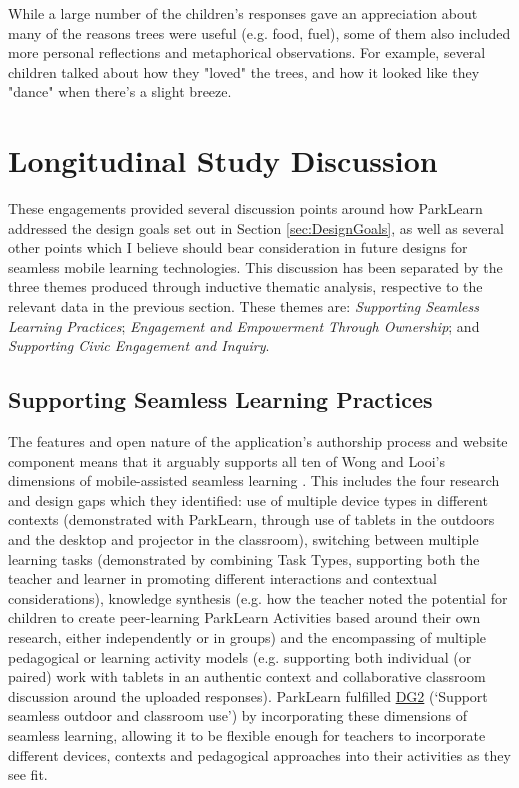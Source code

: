 While a large number of the children's responses gave an appreciation about many of the reasons trees were useful (e.g. food, fuel), some of them also included more personal reflections and metaphorical observations. For example, several children talked about how they "loved" the trees, and how it looked like they "dance" when there's a slight breeze.

\section{Longitudinal Study Discussion}
\label{sec:TeacherDiscussion}
These engagements provided several discussion points around how ParkLearn addressed the design goals set out in Section \ref{sec:DesignGoals}, as well as several other points which I believe should bear consideration in future designs for seamless mobile learning technologies. This discussion has been separated by the three themes produced through inductive thematic analysis, respective to the relevant data in the previous section. These themes are: \textit{Supporting Seamless Learning Practices}; \textit{Engagement and Empowerment Through Ownership}; and \textit{Supporting Civic Engagement and Inquiry}.

\subsection{Supporting Seamless Learning Practices}

The features and open nature of the application's authorship process and website component means that it arguably supports all ten of Wong and Looi’s dimensions of mobile-assisted seamless learning \citep{Wong2011}.  This includes the four research and design gaps which they identified: use of multiple device types in different contexts (demonstrated with ParkLearn, through use of tablets in the outdoors and the desktop and projector in the classroom), switching between multiple learning tasks (demonstrated by combining Task Types, supporting both the teacher and learner in promoting different interactions and contextual considerations), knowledge synthesis (e.g. how the teacher noted the potential for children to create peer-learning ParkLearn Activities based around their own research, either independently or in groups) and the encompassing of multiple pedagogical or learning activity models (e.g. supporting both individual (or paired) work with tablets in an authentic context and collaborative classroom discussion around the uploaded responses). ParkLearn fulfilled \hyperref[DG2]{DG2} (`Support seamless outdoor and classroom use') by incorporating these dimensions of seamless learning, allowing it to be flexible enough for teachers to incorporate different devices, contexts and pedagogical approaches into their activities as they see fit.
  

